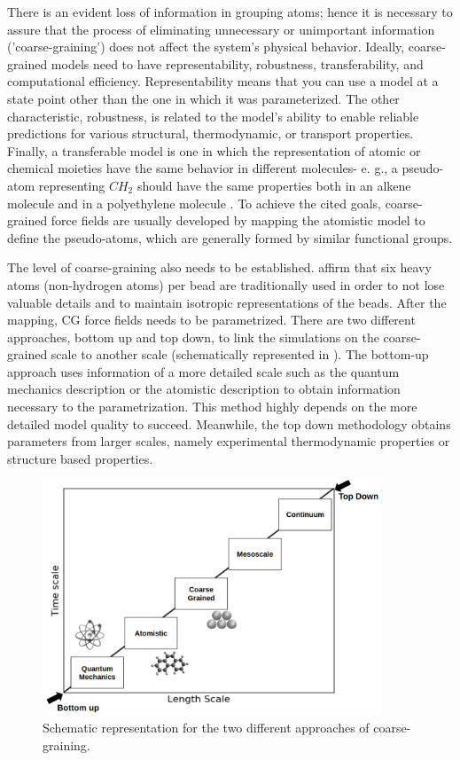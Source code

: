 There is an evident loss of information in grouping atoms; hence it is necessary to assure that the process of eliminating unnecessary or unimportant information ('coarse-graining') does not affect the system's physical behavior. Ideally, coarse-grained models need to have representability, robustness, transferability, and computational efficiency. Representability means that you can use a model at a state point other than the one in which it was parameterized. The other characteristic, robustness, is related to the model's ability to enable reliable predictions for various structural, thermodynamic, or transport properties. Finally, a transferable model is one in which the representation of atomic or chemical moieties have the same behavior in different molecules- e. g., a pseudo-atom representing $CH_{2}$ should have the same properties both in an alkene molecule and in a polyethylene molecule     \cite{doi:10.1146/annurev-chembioeng-061312-103314}. To achieve the cited goals, coarse-grained force fields are usually developed by mapping the atomistic model to define the pseudo-atoms, which are generally formed by similar functional groups. 

The level of coarse-graining also needs to be established.  affirm that six heavy atoms (non-hydrogen atoms) per bead are traditionally used in order to not lose valuable details and to maintain isotropic representations of the beads. After the mapping, CG force fields needs to be parametrized. There are two different approaches, bottom up and top down, to link the simulations on the coarse-grained scale to another scale (schematically represented in ). The bottom-up approach uses information of a more detailed scale such as the quantum mechanics description or the atomistic description to obtain information necessary to the parametrization. This method highly depends on the more detailed model quality to succeed. Meanwhile, the top down methodology obtains parameters from larger scales, namely experimental thermodynamic properties or structure based properties. 

\begin{figure}[H]
	\raggedleft
	\includegraphics[width=0.9\textwidth]{Figures/multiscale}
	\caption{Schematic representation for the two different approaches of coarse-graining.}
	\label{fig:multiscale}
\end{figure}
\FloatBarrier

